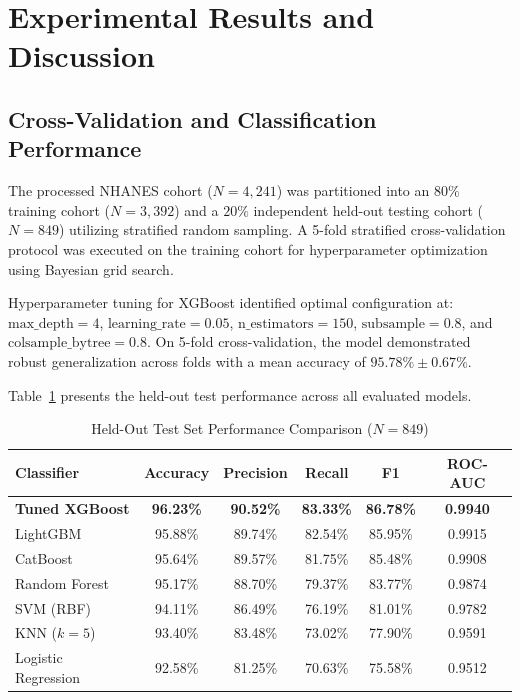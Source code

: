 \documentclass[conference]{IEEEtran}
\begin{document}
\section{Experimental Results and Discussion}

\subsection{Cross-Validation and Classification Performance}
The processed NHANES cohort ($N = 4,241$) was partitioned into an $80\%$ training cohort ($N = 3,392$) and a $20\%$ independent held-out testing cohort ($N = 849$) utilizing stratified random sampling. A 5-fold stratified cross-validation protocol was executed on the training cohort for hyperparameter optimization using Bayesian grid search.

Hyperparameter tuning for XGBoost identified optimal configuration at: $\text{max\_depth} = 4$, $\text{learning\_rate} = 0.05$, $\text{n\_estimators} = 150$, $\text{subsample} = 0.8$, and $\text{colsample\_bytree} = 0.8$. On 5-fold cross-validation, the model demonstrated robust generalization across folds with a mean accuracy of $95.78\% \pm 0.67\%$.

Table~\ref{tab:benchmarks} presents the held-out test performance across all evaluated models.

\begin{table}[h]
\caption{Held-Out Test Set Performance Comparison ($N=849$)}
\label{tab:benchmarks}
\centering
\begin{tabular}{lccccc}
\toprule
\textbf{Classifier} & \textbf{Accuracy} & \textbf{Precision} & \textbf{Recall} & \textbf{F1} & \textbf{ROC-AUC} \\
\midrule
\textbf{Tuned XGBoost} & \textbf{96.23\%} & \textbf{90.52\%} & \textbf{83.33\%} & \textbf{86.78\%} & \textbf{0.9940} \\
LightGBM & 95.88\% & 89.74\% & 82.54\% & 85.95\% & 0.9915 \\
CatBoost & 95.64\% & 89.57\% & 81.75\% & 85.48\% & 0.9908 \\
Random Forest & 95.17\% & 88.70\% & 79.37\% & 83.77\% & 0.9874 \\
SVM (RBF) & 94.11\% & 86.49\% & 76.19\% & 81.01\% & 0.9782 \\
KNN ($k=5$) & 93.40\% & 83.48\% & 73.02\% & 77.90\% & 0.9591 \\
Logistic Regression & 92.58\% & 81.25\% & 70.63\% & 75.58\% & 0.9512 \\
\bottomrule
\end{tabular}
\end{table}
\end{document}

